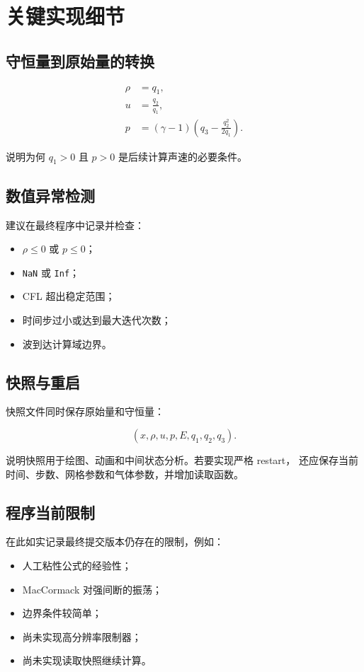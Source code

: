 \section{关键实现细节}

\subsection{守恒量到原始量的转换}

\begin{align}
\rho &= q_1,\\
u &= \frac{q_2}{q_1},\\
p &= (\gamma-1)
\left(
q_3-\frac{q_2^2}{2q_1}
\right).
\end{align}

说明为何 $q_1>0$ 且 $p>0$ 是后续计算声速的必要条件。

\subsection{数值异常检测}

建议在最终程序中记录并检查：

\begin{itemize}[leftmargin=2em]
    \item $\rho\le 0$ 或 $p\le 0$；
    \item \texttt{NaN} 或 \texttt{Inf}；
    \item CFL 超出稳定范围；
    \item 时间步过小或达到最大迭代次数；
    \item 波到达计算域边界。
\end{itemize}

\subsection{快照与重启}

快照文件同时保存原始量和守恒量：

\begin{equation}
(x,\rho,u,p,E,q_1,q_2,q_3).
\end{equation}

说明快照用于绘图、动画和中间状态分析。若要实现严格 restart，
还应保存当前时间、步数、网格参数和气体参数，并增加读取函数。

\subsection{程序当前限制}

在此如实记录最终提交版本仍存在的限制，例如：

\begin{itemize}[leftmargin=2em]
    \item 人工粘性公式的经验性；
    \item MacCormack 对强间断的振荡；
    \item 边界条件较简单；
    \item 尚未实现高分辨率限制器；
    \item 尚未实现读取快照继续计算。
\end{itemize}
